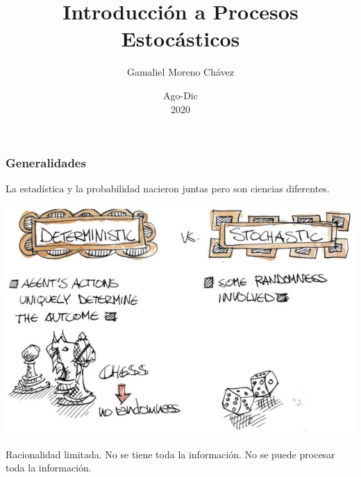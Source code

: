 \documentclass[spanish]{beamer}
\begin{document}
\title{Introducción a Procesos Estocásticos}
\author{Gamaliel Moreno Chávez}
\date{Ago-Dic\\ 2020}%

\frame{\titlepage}

\begin{frame}
\frametitle{Generalidades}
La estadística y la probabilidad nacieron juntas pero son ciencias diferentes. 

\begin{center}
\includegraphics[scale=0.9]{im1}
\end{center}

Racionalidad limitada. No se tiene toda la información. No se puede procesar toda la información.  
\end{frame}
\end{document}
